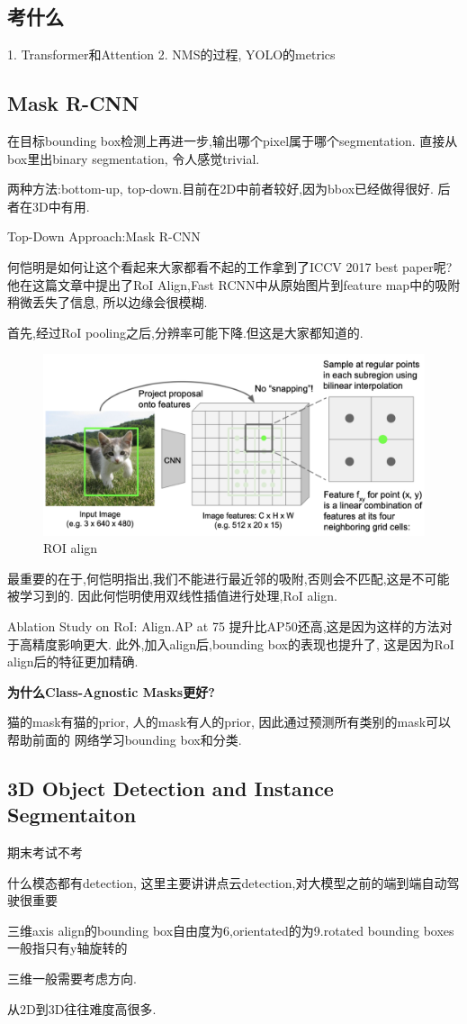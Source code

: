 \subsection{考什么}

1. Transformer和Attention
2. NMS的过程, YOLO的metrics

\subsection{Mask R-CNN}

在目标bounding box检测上再进一步,输出哪个pixel属于哪个segmentation.
直接从box里出binary segmentation, 令人感觉trivial.

两种方法:bottom-up, top-down.目前在2D中前者较好,因为bbox已经做得很好.
后者在3D中有用.

Top-Down Approach:Mask R-CNN

何恺明是如何让这个看起来大家都看不起的工作拿到了ICCV 2017 best paper呢?
他在这篇文章中提出了RoI Align,Fast RCNN中从原始图片到feature map中的吸附
稍微丢失了信息, 所以边缘会很模糊.

首先,经过RoI pooling之后,分辨率可能下降.但这是大家都知道的.

\begin{figure}[htbp]
    \centering
    \includegraphics[scale=0.3]{figures/ROI_align.png}
    \caption{ROI align}
    \label{fig:ROI_align}
\end{figure}

最重要的在于,何恺明指出,我们不能进行最近邻的吸附,否则会不匹配,这是不可能被学习到的.
因此何恺明使用双线性插值进行处理,RoI align.

Ablation Study on RoI:
Align.AP at 75 提升比AP50还高,这是因为这样的方法对于高精度影响更大.
此外,加入align后,bounding box的表现也提升了, 这是因为RoI align后的特征更加精确.

\textbf{为什么Class-Agnostic Masks更好?}

猫的mask有猫的prior, 人的mask有人的prior, 因此通过预测所有类别的mask可以帮助前面的
网络学习bounding box和分类.

\subsection{3D Object Detection and Instance Segmentaiton}

期末考试不考

什么模态都有detection, 这里主要讲讲点云detection,对大模型之前的端到端自动驾驶很重要

三维axis align的bounding box自由度为6,orientated的为9.rotated bounding boxes
一般指只有y轴旋转的

三维一般需要考虑方向.

从2D到3D往往难度高很多.
